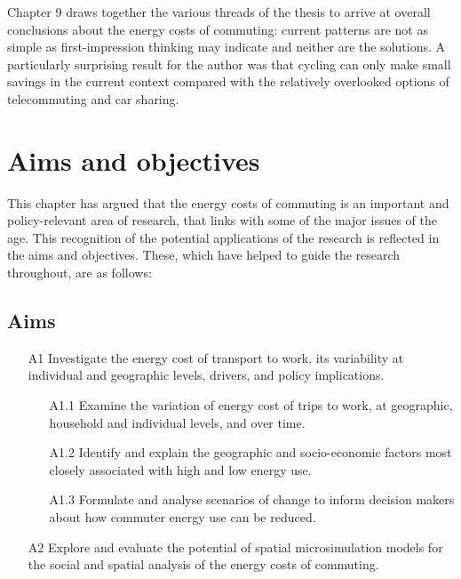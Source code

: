 Chapter 9 draws
together the various threads of the thesis to arrive at overall conclusions
about the energy costs of commuting: current patterns are not as simple
as first-impression thinking may indicate and neither are the solutions.
A particularly surprising result for the author was that cycling
can only make small savings in the current context compared with
the relatively overlooked options of telecommuting and car sharing.

\section{Aims and objectives} \label{s:aims}
This chapter has argued that the energy costs of commuting is an
important and policy-relevant area of research, that links with
some of the major issues of the age.
This recognition of the potential applications of the research
is reflected in the aims and objectives. These, which have
helped to guide the research throughout, are as follows:

\subsection{Aims}
\begin{itemize}
 \item[A1] Investigate the energy cost of transport to work, its variability
at individual and geographic levels, drivers, and policy implications.
  \begin{itemize}
   \item[A1.1] Examine the variation of energy cost of trips to work, at
      geographic,	household and individual levels, and over time.
    \item[A1.2] Identify and explain the geographic and socio-economic factors
most closely  associated with high and low energy use.
    \item[A1.3] Formulate and analyse scenarios of change to inform decision
    makers about how commuter energy use can be reduced.
  \end{itemize}
  \item[A2] Explore and evaluate the potential of spatial microsimulation
models for the social and spatial analysis of the energy costs of commuting.
\end{itemize}

